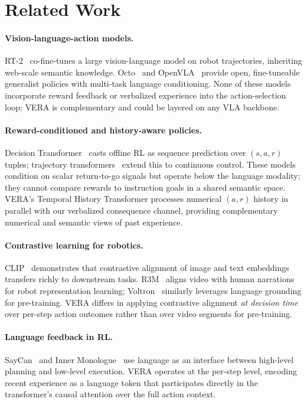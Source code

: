 \documentclass{article}
\newcommand{\vera}{\textsc{VERA}}
\begin{document}
\section{Related Work}
\label{sec:related}

\paragraph{Vision-language-action models.}
RT-2~\citep{rt2} co-fine-tunes a large vision-language model on robot trajectories,
inheriting web-scale semantic knowledge.
Octo~\citep{octo} and OpenVLA~\citep{openVLA} provide open, fine-tuneable generalist
policies with multi-task language conditioning.
None of these models incorporate reward feedback or verbalized experience into the
action-selection loop; \vera{} is complementary and could be layered on any VLA backbone.

\paragraph{Reward-conditioned and history-aware policies.}
Decision Transformer~\citep{dt} casts offline RL as sequence prediction over
$(s, a, r)$ tuples; trajectory transformers~\citep{trajTF} extend this to
continuous control.
These models condition on scalar return-to-go signals but operate below the
language modality; they cannot compare rewards to instruction goals in a shared
semantic space.
\vera{}'s Temporal History Transformer processes numerical $(a, r)$ history
in parallel with our verbalized consequence channel, providing complementary
numerical and semantic views of past experience.

\paragraph{Contrastive learning for robotics.}
CLIP~\citep{clip} demonstrates that contrastive alignment of image and text
embeddings transfers richly to downstream tasks.
R3M~\citep{r3m} aligns video with human narrations for robot representation learning;
Voltron~\citep{voltron} similarly leverages language grounding for pre-training.
\vera{} differs in applying contrastive alignment \emph{at decision time}
over per-step action outcomes rather than over video segments for pre-training.

\paragraph{Language feedback in RL.}
SayCan~\citep{saycan} and Inner Monologue~\citep{innermonologue} use language as
an interface between high-level planning and low-level execution.
\vera{} operates at the per-step level, encoding recent experience as a language
token that participates directly in the transformer's causal attention over the
full action context.
\end{document}
